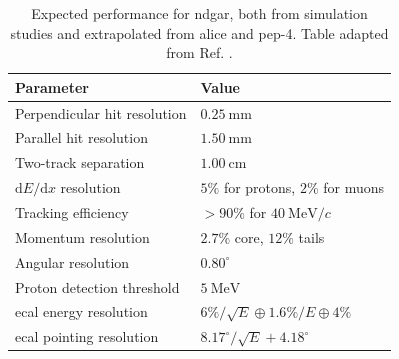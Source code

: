 \begin{table}[t]
	\caption[Expected performance for \gls{ndgar}, both from simulation studies and extrapolated from \gls{alice} and \gls{pep}-4.]{Expected performance for \gls{ndgar}, both from simulation studies and extrapolated from \gls{alice} and \gls{pep}-4. Table adapted from Ref. \cite{DUNE2021NDCDR}.}
	\begin{center}
		\begin{small}
            \begin{tabular}{l|l}
                Parameter                            & Value                                        \\[2mm] \hline
                \rule{0pt}{1.1\normalbaselineskip}Perpendicular hit resolution         & $0.25~\mathrm{mm}$                           \\[2mm] 
                Parallel hit resolution              & $1.50~\mathrm{mm}$                           \\[2mm] 
                Two-track separation                 & $1.00~\mathrm{cm}$                           \\[2mm] 
                $\mathrm{d}E/\mathrm{d}x$ resolution & $5\%$ for protons, $2\%$ for muons           \\[2mm] 
                Tracking efficiency                  & $>90\%$ for $40 ~ \mathrm{MeV}/c$            \\[2mm] 
                Momentum resolution                  & $2.7\%$ core, $12\%$ tails                   \\[2mm] 
                Angular resolution                   & $0.80^{\circ}$                               \\[2mm] 
                Proton detection threshold           & $5 ~ \mathrm{MeV}$                           \\[2mm] 
                \gls{ecal} energy resolution               & $6\% / \sqrt{E} \oplus 1.6\% / E \oplus 4\%$ \\[2mm] 
                \gls{ecal} pointing resolution             & $8.17^{\circ} / \sqrt{E} + 4.18^{\circ}$    
            \end{tabular}
		\end{small}
	\end{center}
	\label{tab:detector_systs}
\end{table}

